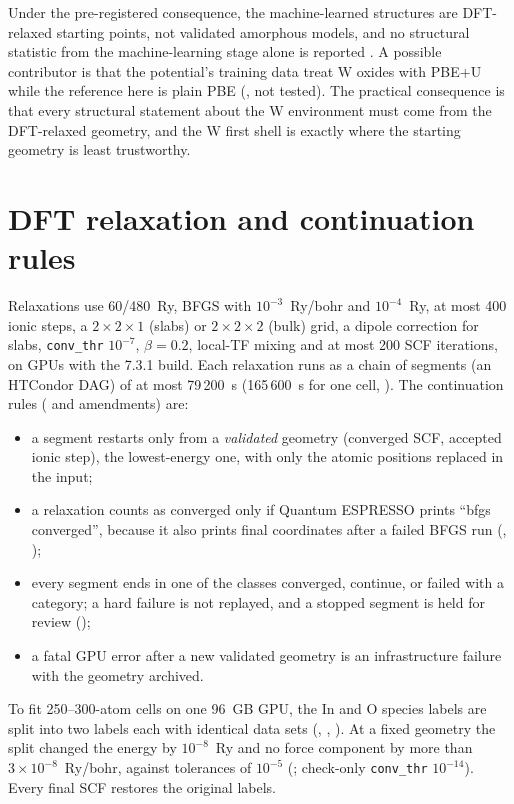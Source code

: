 Under the pre-registered consequence, the machine-learned structures are DFT-relaxed starting points, not validated
amorphous models, and no structural statistic from the machine-learning stage alone is reported . A possible
contributor is that the potential's training data treat W oxides with PBE+U while the reference here is plain PBE
(, not tested). The practical consequence is that every structural statement about the W environment
must come from the DFT-relaxed geometry, and the W first shell is exactly where the starting geometry is least
trustworthy.

\section{DFT relaxation and continuation rules}
\label{sec:mono-am-relax}

Relaxations use 60/480~Ry, BFGS with $10^{-3}$~Ry/bohr and $10^{-4}$~Ry, at most 400 ionic steps, a
$2\times2\times1$ (slabs) or $2\times2\times2$ (bulk) grid, a dipole correction for slabs, \texttt{conv\_thr}
$10^{-7}$, $\beta = 0.2$, local-TF mixing and at most 200 SCF iterations, on GPUs with the 7.3.1 build. Each relaxation
runs as a chain of segments (an HTCondor DAG) of at most 79\,200~s (165\,600~s for one cell, ). The
continuation rules ( and amendments) are:
\begin{itemize}
\item a segment restarts only from a \emph{validated} geometry (converged SCF, accepted ionic step), the lowest-energy
one, with only the atomic positions replaced in the input;
\item a relaxation counts as converged only if Quantum ESPRESSO prints ``bfgs converged'', because it also prints final
coordinates after a failed BFGS run (, );
\item every segment ends in one of the classes converged, continue, or failed with a category; a hard failure is not
replayed, and a stopped segment is held for review ();
\item a fatal GPU error after a new validated geometry is an infrastructure failure with the geometry archived.
\end{itemize}
To fit 250--300-atom cells on one 96~GB GPU, the In and O species labels are split into two labels each with identical
data sets (, , ). At a fixed geometry the split changed the energy by
$10^{-8}$~Ry and no force component by more than $3\times10^{-8}$~Ry/bohr, against tolerances of $10^{-5}$
(; check-only \texttt{conv\_thr} $10^{-14}$). Every final SCF restores the original labels.

